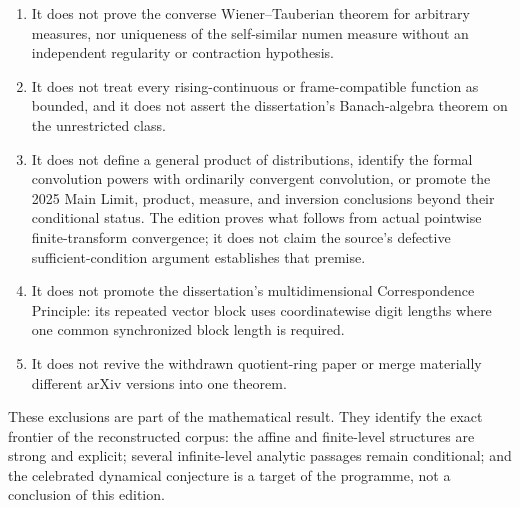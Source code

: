 \begin{enumerate}[label=\textup{(N\arabic*)}]
\item It does not prove the converse Wiener--Tauberian theorem for arbitrary
      measures, nor uniqueness of the self-similar numen measure without an
      independent regularity or contraction hypothesis.
\item It does not treat every rising-continuous or frame-compatible function
      as bounded, and it does not assert the dissertation's Banach-algebra
      theorem on the unrestricted class.
\item It does not define a general product of distributions, identify the
      formal convolution powers with ordinarily convergent convolution, or
      promote the 2025 Main Limit, product, measure, and inversion conclusions
      beyond their conditional status.  The edition proves what follows from
      actual pointwise finite-transform convergence; it does not claim the
      source's defective sufficient-condition argument establishes that
      premise.
\item It does not promote the dissertation's multidimensional
      Correspondence Principle: its repeated vector block uses
      coordinatewise digit lengths where one common synchronized block length
      is required.
\item It does not revive the withdrawn quotient-ring paper or merge materially
      different arXiv versions into one theorem.
\end{enumerate}

These exclusions are part of the mathematical result.  They identify the
exact frontier of the reconstructed corpus: the affine and finite-level
structures are strong and explicit; several infinite-level analytic
passages remain conditional; and the celebrated dynamical conjecture is a
target of the programme, not a conclusion of this edition.
